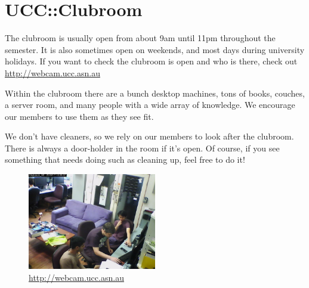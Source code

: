 \chapter{UCC::Clubroom}

\null
The clubroom is usually open from about 9am until 11pm throughout the semester. It is also sometimes open on weekends, and most days during university holidays. If you want to check the clubroom is open and who is there, check out \url{http://webcam.ucc.asn.au}

Within the clubroom there are a bunch desktop machines, tons of books, couches, a server room, and many people with a wide array of knowledge. We encourage our members to use them as they see fit.

We don't have cleaners, so we rely on our members to look after the clubroom. There is always a door-holder in the room if it's open. Of course, if you see something that needs doing such as cleaning up, feel free to do it!

\begin{figure}[H]
	\centering
	\includegraphics[width=0.5\textwidth]{figures/webcam.jpg}
	\caption{\url{http://webcam.ucc.asn.au}}
	\label{webcam.jpg}
\end{figure}

